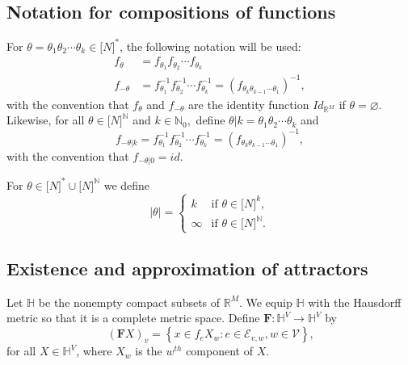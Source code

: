 \documentclass{amsproc}
\theoremstyle{plain}
\theoremstyle{definition}
\numberwithin{equation}{section}
\begin{document}
\subsection{Notation for compositions of functions}

For $\theta=\theta_{1}\theta_{2}\cdots\theta_{k}\in\lbrack N]^{\ast}$, the
following notation will be used: 
\begin{equation*}
\begin{aligned} f_{\theta} &= f_{\theta_{1}} f_{\theta_{2}}\cdots
f_{\theta_k} \\ f_{-\theta} &=f_{\theta_{1}}^{-1}f_{\theta_{2}}^{-1}\cdots
f_{\theta_k}^{-1}=(f_{\theta_k\theta_{k-1}\cdots\theta_{1}})^{-1},
\end{aligned}
\end{equation*}
with the convention that $f_{\theta}$ and $f_{-\theta}$ are the identity
function $Id_{\mathbb{R}^{M}}$ if $\theta=\varnothing$. Likewise, for all $%
\theta\in\lbrack N]^{\mathbb{N}}$ and $k\in\mathbb{N}_{0},$ define $%
\theta|k=\theta_{1}\theta_{2}\cdots\theta_{k}$ and%
\begin{equation*}
f_{-\theta|k}=f_{\theta_{1}}^{-1}f_{\theta_{2}}^{-1}\cdots
f_{\theta_{k}}^{-1}=(f_{\theta_{k}\theta_{k-1}\cdots\theta_{1}})^{-1},
\end{equation*}
with the convention that $f_{-\theta|0}=id$.

For $\theta\in\lbrack N]^{\ast}\cup\lbrack N]^{\mathbb{N}}$ we define 
\begin{equation*}
\left\vert \theta\right\vert =\left\{ 
\begin{array}{cc}
k & \text{if }\theta\in\lbrack N]^{k}, \\ 
\infty & \text{if }\theta\in\lbrack N]^{\mathbb{N}}.%
\end{array}
\right.
\end{equation*}

\subsection{Existence and approximation of attractors}

Let $\mathbb{H}$ be the nonempty compact subsets of $\mathbb{R}^{M}$. We
equip $\mathbb{H}$ with the Hausdorff metric so that it is a complete metric
space. Define $\mathbf{F:}\mathbb{H}^{V}\rightarrow\mathbb{H}^{V}$ by%
\begin{equation*}
\left( \mathbf{F}X\right) _{v}=\left\{ x\in f_{e}X_{w}:e\in\mathcal{E}%
_{v,w},w\in\mathcal{V}\right\} \text{,}
\end{equation*}
for all $X\in\mathbb{H}^{V}$, where $X_{w}$ is the $w^{th}$ component of $X$.
\end{document}

